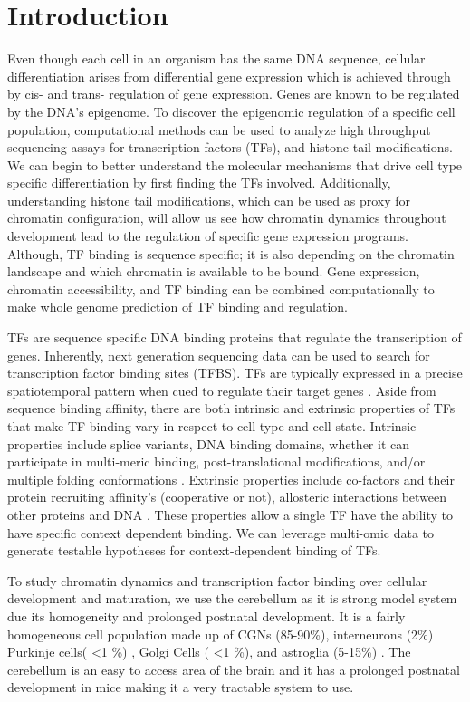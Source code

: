 \documentclass[fleqn,10pt]{wlscirep}
\begin{document}
\section*{Introduction}
Even though each cell in an organism has the same DNA sequence, cellular differentiation arises from differential gene expression which is achieved through by cis- and trans- regulation of gene expression. Genes are known to be regulated by the DNA’s epigenome. To discover the epigenomic regulation of a specific cell population, computational methods can be used to analyze high throughput sequencing assays for transcription factors (TFs), and histone tail modifications. We can begin to better understand the molecular mechanisms that drive cell type specific differentiation by first finding the TFs involved. Additionally, understanding histone tail modifications, which can be used as proxy for chromatin configuration, will allow us see how chromatin dynamics throughout development lead to the regulation of specific gene expression programs. Although, TF binding is sequence specific; it is also depending on the chromatin landscape and which chromatin is available to be bound. Gene expression, chromatin accessibility, and TF binding can be combined computationally to make whole genome prediction of TF binding and regulation.

TFs are sequence specific DNA binding proteins that regulate the transcription of genes. Inherently, next generation sequencing data can be used to search for transcription factor binding sites (TFBS).  TFs are typically expressed in a precise spatiotemporal pattern when cued to regulate their target genes \cite{}. Aside from sequence binding affinity, there are both intrinsic and extrinsic properties of TFs that make TF binding vary in respect to cell type and cell state.  Intrinsic properties include splice variants, DNA binding domains, whether it can participate in multi-meric binding, post-translational modifications, and/or multiple folding conformations \cite{Siggers2014Protein-DNACodes, Slattery2014AbsenceGenome}. Extrinsic properties include co-factors and their protein recruiting affinity's (cooperative or not), allosteric interactions between other proteins and DNA \cite{Siggers2014Protein-DNACodes}. These properties allow a single TF have the ability to have specific context dependent binding. We can leverage multi-omic data to generate testable hypotheses for context-dependent binding of TFs.
 
To study chromatin dynamics and transcription factor binding over cellular development and maturation, we use the cerebellum as it is strong model system due its homogeneity and prolonged postnatal development.  It is a fairly homogeneous cell population made up of CGNs (85-90\%), interneurons (2\%) Purkinje cells( \textless 1 \%) , Golgi Cells ( \textless 1 \%), and astroglia (5-15\%) \cite{Frank2015RegulationCerebellum}. The cerebellum is an easy to access area of the brain and it has a prolonged postnatal development in mice making it a very tractable system to use\cite{Wang2001GeneticDevelopment}. 
\end{document}
